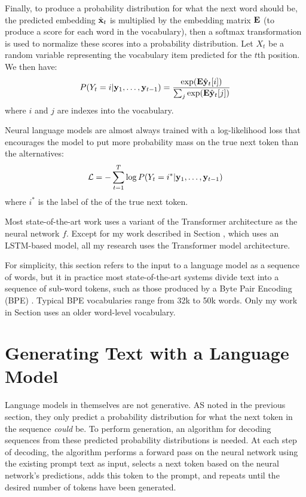 Finally, to produce a probability distribution for what the next word should be, the predicted embedding $\hat{\mathbf{x}}_t$ is multiplied by the embedding matrix $\mathbf{E}$ (to produce a score for each word in the vocabulary), then a softmax transformation is used to normalize these scores into a probability distribution.
Let $X_t$ be a random variable representing the vocabulary item predicted for the $t$th position. We then have:
\begin{align}
    \label{equation:vocab}
    P(Y_t=i | \mathbf{y}_1, \ldots, \mathbf{y}_{t-1}) = \frac{\exp(\mathbf{E}\hat{\mathbf{y}}_t[i])}{\sum_j\exp(\mathbf{E}\hat{\mathbf{y}}_t[j])}
\end{align}
where $i$ and $j$ are indexes into the vocabulary.

Neural language models are almost always trained with a log-likelihood loss that encourages the model to put more probability mass on the true next token than the alternatives:
\begin{align}
    \mathcal{L} = -\sum_{t=1}^T \log P(Y_t=i^* | \mathbf{y}_1, \ldots, \mathbf{y}_{t-1})
\end{align}
where $i^*$ is the label of the of the true next token.

Most state-of-the-art work uses a variant of the Transformer architecture \cite{vaswani2017attention} as the neural network $f$.
Except for my work described in Section , which uses an LSTM-based model, all my research uses the Transformer model architecture.

For simplicity, this section refers to the input to a language model as a sequence of words, but it in practice most state-of-the-art systems divide text into a sequence of sub-word tokens, such as those produced by a Byte Pair Encoding (BPE) \citep{sennrich2016neural}.
Typical BPE vocabularies range from 32k to 50k words.
Only my work in Section  uses an older word-level vocabulary.

\section{Generating Text with a Language Model}

Language models in themselves are not generative. AS noted in the previous section, they only predict a probability distribution for what the next token in the sequence \textit{could} be.
To perform generation, an algorithm for decoding sequences from these predicted probability distributions is needed.
At each step of decoding, the algorithm performs a forward pass on the neural network using the existing prompt text as input, selects a next token based on the neural network's predictions, adds this token to the prompt, and repeats until the desired number of tokens have been generated.


